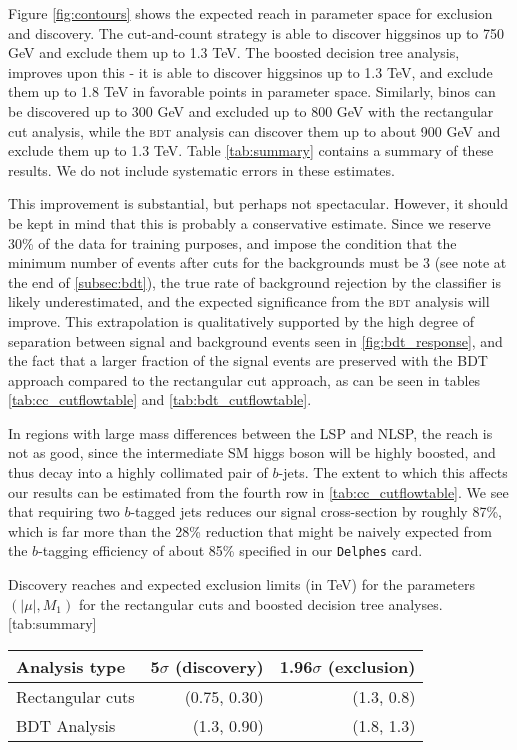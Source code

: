 Figure \ref{fig:contours} shows the expected reach in parameter space for exclusion and discovery. The cut-and-count strategy is able to discover higgsinos up to 750 GeV  and exclude them up to 1.3 TeV. The boosted decision tree analysis, improves upon this - it is able to discover higgsinos up to 1.3 TeV, and exclude them up to 1.8 TeV in favorable points in parameter space. Similarly, binos can be discovered up to 300 GeV and excluded up to 800 GeV with the rectangular cut analysis, while the \textsc{bdt} analysis can discover them up to about 900 GeV and exclude them up to 1.3 TeV. Table \ref{tab:summary} contains a summary of these results. We do not include systematic errors in these estimates.  

This improvement is substantial, but perhaps not spectacular. However, it should be kept in mind that this is probably a conservative estimate. Since we reserve 30\% of the data for training purposes, and impose the condition that the minimum number of events after cuts for the backgrounds must be 3 (see note at the end of \autoref{subsec:bdt}), the true rate of background rejection by the classifier is likely underestimated, and the expected significance from the \textsc{bdt} analysis will improve. This extrapolation is qualitatively supported by the high degree of separation between signal and background events seen in \autoref{fig:bdt_response}, and the fact that a larger fraction of the signal events are preserved with the BDT approach compared to the rectangular cut approach, as can be seen in tables \ref{tab:cc_cutflowtable} and \ref{tab:bdt_cutflowtable}. 

In regions with large mass differences between the LSP and NLSP, the reach is not as good, since the intermediate SM higgs boson will be highly boosted, and thus decay into a highly collimated pair of $b$-jets. The extent to which this affects our results can be estimated from the fourth row in \autoref{tab:cc_cutflowtable}. We see that requiring two $b$-tagged jets reduces our signal cross-section by roughly 87\%, which is far more than the 28\% reduction that might be naively expected from the $b$-tagging efficiency of about 85\% specified in our \texttt{Delphes} card. 

\begin{table}
  \begin{sidecaption}{Discovery reaches and expected exclusion limits (in TeV) for the parameters $(|\mu|,M_1)$ for the rectangular cuts and boosted decision tree analyses.}[tab:summary]
\centering
\begin{tabular}{lrr}
\toprule
Analysis type & 5$\sigma$ (discovery)& 1.96$\sigma$ (exclusion)\\
\midrule
Rectangular cuts & (0.75, 0.30) & (1.3, 0.8)\\
BDT Analysis & (1.3, 0.90) & (1.8, 1.3)\\
\bottomrule
\end{tabular}
\end{sidecaption}

\end{table}

